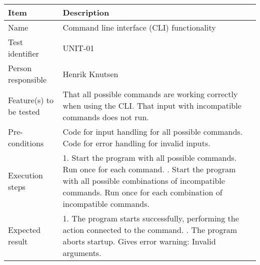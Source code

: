 \documentclass[12pt, fullpage, oneside]{report}
\begin{document}
		\begin{center}
			\begin{tabular}{ |  p{3.5cm} | p{10cm} | }
				\hline
				Item & Description \\ [5pt] \hline \hline
				Name & Command line interface (CLI) functionality \\  [5pt] \hline
				Test identifier & UNIT-01 \\  [5pt] \hline
				Person responsible & Henrik Knutsen \\  [5pt] \hline
				Feature(s) to be tested & That all possible commands are working correctly when using the CLI. That input with incompatible commands does not run. \\  [5pt] \hline
				Pre-conditions & Code for input handling for all possible commands. Code for error handling for invalid inputs. \\  [5pt] \hline
				Execution steps & 1. Start the program with all possible commands. Run once for each command. \newline 2. Start the program with all possible combinations of incompatible commands. Run once for each combination of incompatible commands. \\  [5pt] \hline
				Expected result & 1. The program starts successfully, performing the action connected to the command. \newline 2. The program aborts startup. Gives error warning: Invalid arguments. \\  [5pt] \hline
			\end{tabular}
		\end{center}
\end{document}

